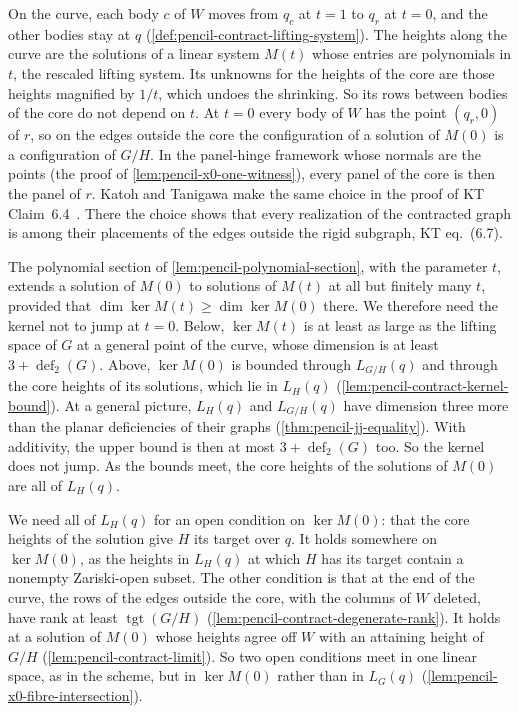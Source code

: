 On the curve, each body $c$ of $W$ moves from $q_c$ at $t = 1$ to $q_r$
at $t = 0$, and the other bodies stay at $q$
(\cref{def:pencil-contract-lifting-system}). The heights along the curve
are the solutions of a linear system $M(t)$ whose entries are
polynomials in $t$, the rescaled lifting system. Its unknowns for the
heights of the core are those heights magnified by $1/t$, which undoes
the shrinking. So its rows between bodies of the core do not depend on
$t$. At $t = 0$ every body of $W$ has the point $(q_r, 0)$ of $r$, so on
the edges outside the core the configuration of a solution of $M(0)$ is
a configuration of $G/H$. In the panel-hinge framework whose normals are
the points (the proof of \cref{lem:pencil-x0-one-witness}), every panel
of the core is then the panel of $r$. Katoh and Tanigawa make the same
choice in the proof of KT Claim~6.4~\cite[p.~675]{katohTanigawa2011}.
There the choice shows that every realization of the contracted graph is
among their placements of the edges outside the rigid subgraph, KT
eq.~(6.7).

The polynomial section of \cref{lem:pencil-polynomial-section}, with
the parameter $t$, extends a solution of $M(0)$ to solutions of $M(t)$
at all but finitely many $t$, provided that $\dim \ker M(t) \ge \dim \ker M(0)$ there. We therefore
need the kernel not to jump at $t = 0$. Below, $\ker M(t)$ is at least
as large as the lifting space of $G$ at a general point of the curve,
whose dimension is at least $3 + \operatorname{def}_2(G)$. Above,
$\ker M(0)$ is bounded through $L_{G/H}(q)$ and through the core heights
of its solutions, which lie in $L_H(q)$
(\cref{lem:pencil-contract-kernel-bound}). At a general picture,
$L_H(q)$ and $L_{G/H}(q)$ have dimension three more than the planar
deficiencies of their graphs (\cref{thm:pencil-jj-equality}). With
additivity, the upper bound is
then at most $3 + \operatorname{def}_2(G)$ too. So the kernel does not
jump. As the bounds meet, the core heights of the solutions of $M(0)$
are all of $L_H(q)$.

We need all of $L_H(q)$ for an open condition on $\ker M(0)$: that the
core heights of the solution give $H$ its target over $q$. It holds
somewhere on $\ker M(0)$, as the heights in $L_H(q)$ at which $H$ has
its target contain a nonempty Zariski-open subset. The other condition
is that at the end of the curve, the rows of the edges outside the core,
with the columns of $W$ deleted, have rank at least
$\operatorname{tgt}(G/H)$ (\cref{lem:pencil-contract-degenerate-rank}).
It holds at a solution of $M(0)$ whose heights agree off $W$ with an
attaining height of $G/H$ (\cref{lem:pencil-contract-limit}). So two
open conditions meet in one linear space, as in the scheme, but in
$\ker M(0)$ rather than in $L_G(q)$
(\cref{lem:pencil-x0-fibre-intersection}).

